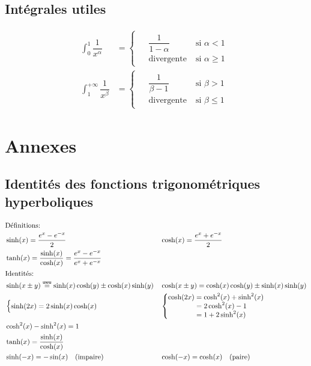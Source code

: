 \documentclass{article}
\newcommand\equwu{\stackrel{\textsf{uwu}}{=}}
\begin{document}
\subsection{Intégrales utiles}
\begin{align}
\int_0^1 \dfrac{1}{x^\alpha} &= 
	\begin{cases} \begin{aligned}
		&\dfrac{1}{1-\alpha} \; &\text{si } \alpha < 1 \\
		&\text{divergente} \; &\text{si } \alpha \geq 1
	\end{aligned}\end{cases} \\
\int_1^{+\infty} \dfrac{1}{x^\beta} &= 
	\begin{cases} \begin{aligned}
		&\dfrac{1}{\beta-1} \; &\text{si } \beta > 1 \\
		&\text{divergente} \; &\text{si } \beta \leq 1
	\end{aligned}\end{cases}
\end{align}


\section{Annexes} \label{sec:annexes}

\subsection{Identités des fonctions trigonométriques hyperboliques} \label{sec:hypertrigo}

\begin{align*}
\intertext{Définitions:}
	&\sinh(x) = \frac{e^x - e^{-x}}{2} & &\cosh(x) = \frac{e^x + e^{-x}}{2} \\
	&\tanh(x) = \frac{\sinh(x)}{\cosh(x)} = \frac{e^x - e^{-x}}{e^x + e^{-x}} \\
\intertext{Identités:}
	&\sinh(x \pm y) \equwu \sinh(x)\cosh(y) \pm \cosh(x)\sinh(y) & &\cosh(x \pm y) = \cosh(x)\cosh(y) \pm \sinh(x)\sinh(y) \\
	&\begin{cases}
		\sinh(2x) = 2\sinh(x)\cosh(x)
	\end{cases} & &\begin{cases}
		\begin{aligned}
			\cosh(2x) &= \cosh^2(x) + \sinh^2(x) \\
						&= 2\cosh^2(x) - 1 \\
						&= 1 + 2\sinh^2(x) 
		\end{aligned}
	\end{cases} \\
	&\cosh^2(x) - \sinh^2(x) = 1 \\
	&\tanh(x) = \frac{\sinh(x)}{\cosh(x)} \\
	&\sinh(-x) = -\sin(x) \quad \text{(impaire)} & &\cosh(-x) = \cosh(x) \quad \text{(paire)}
\end{align*}
\end{document}

